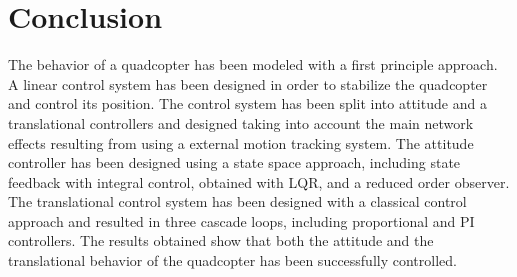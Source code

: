 \section{Conclusion}\label{sec:conclusion}

The behavior of a quadcopter has been modeled with a first principle approach. A linear control system has been designed in order to stabilize the quadcopter and control its position.
The control system has been split into attitude and a translational controllers and designed taking into account the main network effects resulting from using a external motion tracking system. The attitude controller has been designed using a state space approach, including state feedback with integral control, obtained with LQR, and a reduced order observer. The translational control system has been designed with a classical control approach and resulted in three cascade loops, including proportional and PI controllers. The results obtained show that both the attitude and the translational behavior of the quadcopter has been successfully controlled. 

